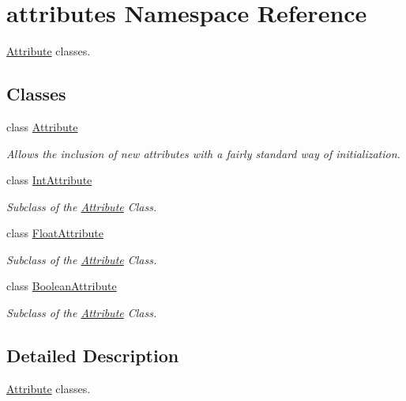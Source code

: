 \hypertarget{namespaceattributes}{\section{attributes Namespace Reference}
\label{namespaceattributes}
}


\hyperlink{classattributes_1_1_attribute}{Attribute} classes.  


\subsection*{Classes}
\begin{DoxyCompactItemize}
\item 
class \hyperlink{classattributes_1_1_attribute}{Attribute}
\begin{DoxyCompactList}\small\item\em Allows the inclusion of new attributes with a fairly standard way of initialization. \end{DoxyCompactList}\item 
class \hyperlink{classattributes_1_1_int_attribute}{Int\-Attribute}
\begin{DoxyCompactList}\small\item\em Subclass of the \hyperlink{classattributes_1_1_attribute}{Attribute} Class. \end{DoxyCompactList}\item 
class \hyperlink{classattributes_1_1_float_attribute}{Float\-Attribute}
\begin{DoxyCompactList}\small\item\em Subclass of the \hyperlink{classattributes_1_1_attribute}{Attribute} Class. \end{DoxyCompactList}\item 
class \hyperlink{classattributes_1_1_boolean_attribute}{Boolean\-Attribute}
\begin{DoxyCompactList}\small\item\em Subclass of the \hyperlink{classattributes_1_1_attribute}{Attribute} Class. \end{DoxyCompactList}\end{DoxyCompactItemize}


\subsection{Detailed Description}
\hyperlink{classattributes_1_1_attribute}{Attribute} classes. 